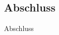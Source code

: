 \subsection{Abschluss}
\label{sec:zusammenfassung}
\subsectionframe

\begin{frame}{Abschluss}
\end{frame}
